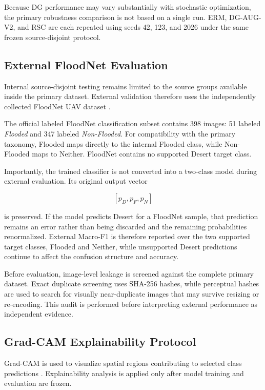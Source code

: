 Because DG performance may vary substantially with stochastic
optimization, the primary robustness comparison is not based on a single
run. ERM, DG-AUG-V2, and RSC are each repeated using seeds 42, 123, and
2026 under the same frozen source-disjoint protocol.

\subsection{External FloodNet Evaluation}

Internal source-disjoint testing remains limited to the source groups
available inside the primary dataset. External validation therefore uses
the independently collected FloodNet UAV dataset
\cite{rahnemoonfar2021floodnet}.

The official labeled FloodNet classification subset contains 398 images:
51 labeled \emph{Flooded} and 347 labeled \emph{Non-Flooded}. For
compatibility with the primary taxonomy, Flooded maps directly to the
internal Flooded class, while Non-Flooded maps to Neither. FloodNet
contains no supported Desert target class.

Importantly, the trained classifier is not converted into a two-class
model during external evaluation. Its original output vector

\[
[p_D,p_F,p_N]
\]

is preserved. If the model predicts Desert for a FloodNet sample, that
prediction remains an error rather than being discarded and the remaining
probabilities renormalized. External Macro-F1 is therefore reported over
the two supported target classes, Flooded and Neither, while unsupported
Desert predictions continue to affect the confusion structure and
accuracy.

Before evaluation, image-level leakage is screened against the complete
primary dataset. Exact duplicate screening uses SHA-256 hashes, while
perceptual hashes are used to search for visually near-duplicate images
that may survive resizing or re-encoding. This audit is performed before
interpreting external performance as independent evidence.

\subsection{Grad-CAM Explainability Protocol}

Grad-CAM is used to visualize spatial regions contributing to selected
class predictions \cite{selvaraju2017gradcam}. Explainability analysis is
applied only after model training and evaluation are frozen.

